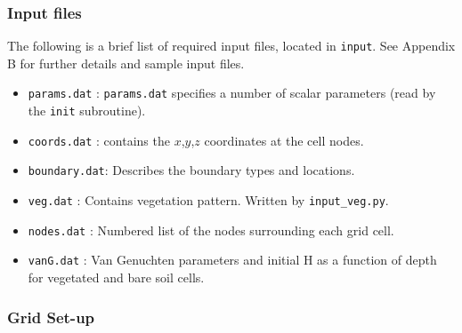 \documentclass{article}
\newcommand{\code}[1]{\texttt{#1}}
\begin{document}
\subsubsection*{Input files}

The following is a brief list of required input files, located in \code{input}. See Appendix B for further details and sample input files.

\begin{itemize}

	\item \code{params.dat} : \code{params.dat} specifies a number of scalar parameters (read by the \code{init} subroutine).  

	\item \code{coords.dat} : contains the $x$,$y$,$z$ coordinates at the cell nodes.

	\item \code{boundary.dat}: Describes the boundary types and locations.

	\item \code{veg.dat} : Contains vegetation pattern. Written by \code{input\_veg.py}. 

	\item \code{nodes.dat} : Numbered list of the nodes surrounding each grid cell.

	\item \code{vanG.dat} : Van Genuchten parameters and initial H as a function of depth for vegetated and bare soil cells. 

\end{itemize}





\subsubsection*{Grid Set-up}
\end{document}
